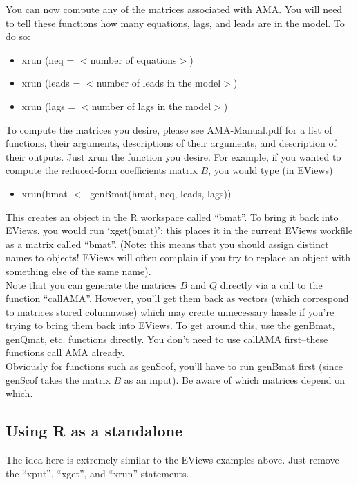 \documentclass[11pt]{article}
\begin{document}
You can now compute any of the matrices associated with AMA.  You will need to tell these functions how many equations, lags, and leads are in the model.  To do so: \begin{itemize}
\item xrun (neq = $<$number of equations$>$) 
\item xrun (leads = $<$number of leads in the model$>$)
\item xrun (lags = $<$number of lags in the model$>$) 
\end{itemize}
To compute the matrices you desire, please see AMA-Manual.pdf for a list of functions, their arguments, descriptions of their arguments, and description of their outputs.  Just xrun the function you desire.  For example, if you wanted to compute the reduced-form coefficients matrix $B$, you would type (in EViews) \begin{itemize}
\item xrun(bmat $<$- genBmat(hmat, neq, leads, lags))
\end{itemize}
This creates an object in the R workspace called ``bmat''.  To bring it back into EViews, you would run `xget(bmat)'; this places it in the current EViews workfile as a matrix called ``bmat''. (Note: this means that you should assign distinct names to objects! EViews will often complain if you try to replace an object with something else of the same name). \\

Note that you can generate the matrices $B$ and $Q$ directly via a call to the function ``callAMA''.  However, you'll get them back as vectors (which correspond to matrices stored columnwise) which may create unnecessary hassle if you're trying to bring them back into EViews.  To get around this, use the genBmat, genQmat, etc. functions directly.  You don't need to use callAMA first--these functions call AMA already.  \\
Obviously for functions such as genScof, you'll have to run genBmat first (since genScof takes the matrix $B$ as an input).  Be aware of which matrices depend on which. \\

\subsection{Using R as a standalone}
The idea here is extremely similar to the EViews examples above.  Just remove the ``xput'', ``xget'', and ``xrun'' statements. 
\end{document}
